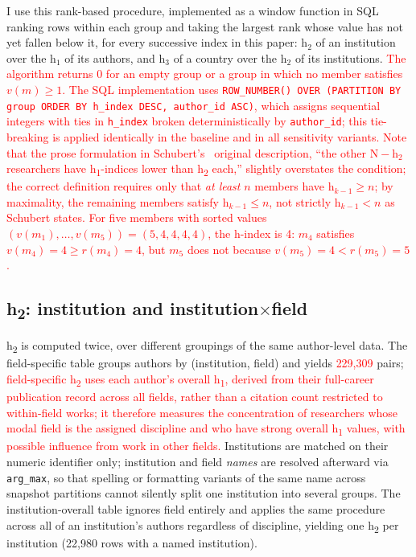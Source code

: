 I use this rank-based procedure, implemented as a window function in SQL ranking rows within each group and taking the largest rank whose value has not yet fallen below it, for every successive index in this paper: $\mathrm{h}_2$ of an institution over the $\mathrm{h}_1$ of its authors, and $\mathrm{h}_3$ of a country over the $\mathrm{h}_2$ of its institutions. \textcolor{red}{The algorithm returns 0 for an empty group or a group in which no member satisfies $v(m)\geq 1$. The SQL implementation uses \texttt{ROW\_NUMBER() OVER (PARTITION BY group ORDER BY h\_index DESC, author\_id ASC)}, which assigns sequential integers with ties in \texttt{h\_index} broken deterministically by \texttt{author\_id}; this tie-breaking is applied identically in the baseline and in all sensitivity variants. Note that the prose formulation in Schubert's~\citeyearpar{parent} original description, ``the other $\mathrm{N}-\mathrm{h}_2$ researchers have h\textsubscript{1}-indices lower than h\textsubscript{2} each,'' slightly overstates the condition; the correct definition requires only that \emph{at least} $n$ members have $\mathrm{h}_{k-1}\geq n$; by maximality, the remaining members satisfy $\mathrm{h}_{k-1}\leq n$, not strictly $\mathrm{h}_{k-1} < n$ as Schubert states. For five members with sorted values $(v(m_1),\ldots,v(m_5))=(5,4,4,4,4)$, the h-index is 4: $m_4$ satisfies $v(m_4)=4\geq r(m_4)=4$, but $m_5$ does not because $v(m_5)=4 < r(m_5)=5$.}

\subsection{h\textsubscript{2}: institution and institution$\times$field}
h\textsubscript{2} is computed twice, over different groupings of the same author-level data. The field-specific table groups authors by (institution, field) and yields \textcolor{red}{229,309} pairs; \textcolor{red}{field-specific h\textsubscript{2} uses each author's overall h\textsubscript{1}, derived from their full-career publication record across all fields, rather than a citation count restricted to within-field works; it therefore measures the concentration of researchers whose modal field is the assigned discipline and who have strong overall h\textsubscript{1} values, with possible influence from work in other fields.} Institutions are matched on their numeric identifier only; institution and field \emph{names} are resolved afterward via \texttt{arg\_max}, so that spelling or formatting variants of the same name across snapshot partitions cannot silently split one institution into several groups. The institution-overall table ignores field entirely and applies the same procedure across all of an institution's authors regardless of discipline, yielding one h\textsubscript{2} per institution (22,980 rows with a named institution).

